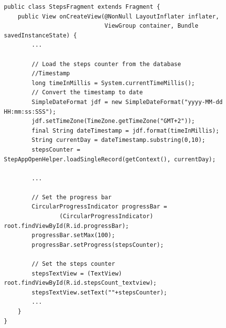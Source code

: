 \documentclass{usireport}
\begin{document}
\begin{verbatim}
public class StepsFragment extends Fragment {
    public View onCreateView(@NonNull LayoutInflater inflater,
                             ViewGroup container, Bundle savedInstanceState) {
        ...

        // Load the steps counter from the database
        //Timestamp
        long timeInMillis = System.currentTimeMillis();
        // Convert the timestamp to date
        SimpleDateFormat jdf = new SimpleDateFormat("yyyy-MM-dd HH:mm:ss:SSS");
        jdf.setTimeZone(TimeZone.getTimeZone("GMT+2"));
        final String dateTimestamp = jdf.format(timeInMillis);
        String currentDay = dateTimestamp.substring(0,10);
        stepsCounter = StepAppOpenHelper.loadSingleRecord(getContext(), currentDay);
        
        ...

        // Set the progress bar
        CircularProgressIndicator progressBar = 
                (CircularProgressIndicator) root.findViewById(R.id.progressBar);
        progressBar.setMax(100);
        progressBar.setProgress(stepsCounter);

        // Set the steps counter
        stepsTextView = (TextView) root.findViewById(R.id.stepsCount_textview);
        stepsTextView.setText(""+stepsCounter);
        ...
    }
}
\end{verbatim}
\end{document}
